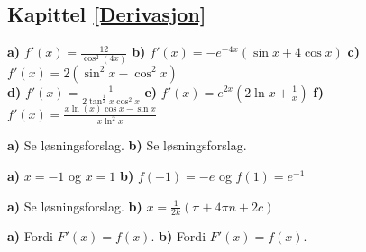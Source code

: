 


\subsection*{Kapittel \ref{Derivasjon}}
\footnotesize
{} \textbf{a)} $f'(x)= \frac{12}{\cos^2(4x)} $ \textbf{b)} $f'(x)= -e^{-4 x} (\sin x + 4 \cos x) $ \textbf{c)} $ f'(x)=2(\sin^2 x -\cos^2 x) $ \\\textbf{d)} $f'(x)= \frac{1}{2\tan^\frac{1}{2}x\cos^2 x} $ \textbf{e)} $f'(x)= e^{2x}\left(2\ln x +\frac{1}{x}\right) $ \textbf{f)} $ f'(x)=\frac{x \ln(x) \cos x - \sin x}{x \ln^2 x} $

\textbf{a)} Se løsningsforslag.
\textbf{b)} Se løsningsforslag.

 \textbf{a)} $ x=-1 $ og $ x=1 $ \textbf{b)} $ f(-1)=-e $ og $ f(1)=e^{-1} $

 \textbf{a)} Se løsningsforslag. \textbf{b)} $ x = \frac{1}{2k}(\pi+4\pi n + 2c) $

 \textbf{a)} Fordi $ F'(x)=f(x) $. \textbf{b)} Fordi  $ F'(x)=f(x) $. 
